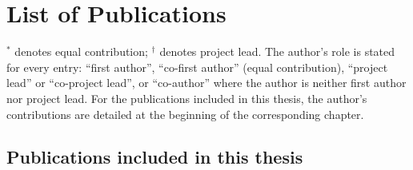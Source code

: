 \chapter*{\centering \Large List of Publications}
\thispagestyle{empty}
\begingroup
\sloppy

\noindent $^{*}$ denotes equal contribution; $^{\dagger}$ denotes project lead. The author's role is stated for every entry: ``first author'', ``co-first author'' (equal contribution), ``project lead'' or ``co-project lead'', or ``co-author'' where the author is neither first author nor project lead. For the publications included in this thesis, the author's contributions are detailed at the beginning of the corresponding chapter.

\section*{Publications included in this thesis}

